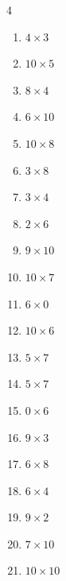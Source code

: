 \begin{multicols}{4}
\begin{enumerate}
  \item $4\times 3$
        \phantom{$=12$}

  \item $10\times 5$
        \phantom{$=50$}

  \item $8\times 4$
        \phantom{$=32$}

  \item $6\times 10$
        \phantom{$=60$}

  \item $10\times 8$
        \phantom{$=80$}

  \item $3\times 8$
        \phantom{$=24$}

  \item $3\times 4$
        \phantom{$=12$}

  \item $2\times 6$
        \phantom{$=12$}

  \item $9\times 10$
        \phantom{$=90$}

  \item $10\times 7$
        \phantom{$=70$}

  \item $6\times 0$
        \phantom{$=0$}

  \item $10\times 6$
        \phantom{$=60$}

  \item $5\times 7$
        \phantom{$=35$}

  \item $5\times 7$
        \phantom{$=35$}

  \item $0\times 6$
        \phantom{$=0$}

  \item $9\times 3$
        \phantom{$=27$}

\columnbreak %

  \item $6\times 8$
        \phantom{$=48$}

  \item $6\times 4$
        \phantom{$=24$}

  \item $9\times 2$
        \phantom{$=18$}

  \item $7\times 10$
        \phantom{$=70$}

  \item $10\times 10$
        \phantom{$=100$}


\end{enumerate}
\end{multicols}

